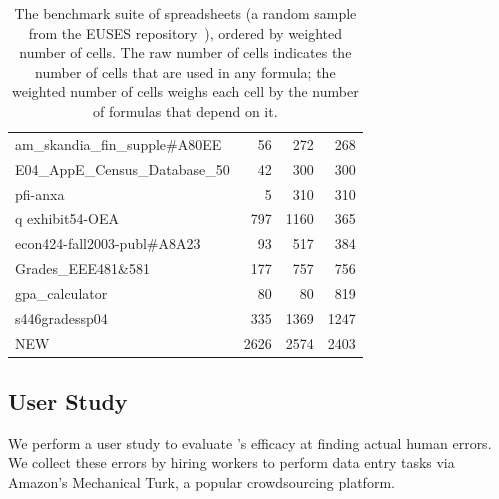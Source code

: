 \begin{table}[t!]
\begin{tabular}{l|rrr}
\small{am\_skandia\_fin\_supple\#A80EE} & \small{56} & \small{272} & \small{268} \\ 
\small{E04\_AppE\_Census\_Database\_50} & \small{42} & \small{300} & \small{300} \\ 
\small{pfi-anxa} & \small{5} & \small{310} & \small{310} \\ 
\small{q exhibit54-OEA} & \small{797} & \small{1160} & \small{365} \\ 
\small{econ424-fall2003-publ\#A8A23} & \small{93} & \small{517} & \small{384} \\ 
\small{Grades\_EEE481\&581} & \small{177} & \small{757} & \small{756} \\ 
\small{gpa\_calculator} & \small{80} & \small{80} & \small{819} \\ 
\small{s446gradessp04} & \small{335} & \small{1369} & \small{1247} \\ 
\small{NEW} & \small{2626} & \small{2574} & \small{2403} \\ 
    \hline
    \end{tabular}%
  \caption{The benchmark suite of spreadsheets (a random sample from the EUSES repository~\cite{Fisher:2005:ESC:1082983.1083242}), ordered by weighted number of cells. The raw number of cells indicates the number of cells that are used in any formula; the weighted number of cells weighs each cell by the number of formulas that depend on it.\label{tab:spreadsheet_characteristics}}
\end{table}





\subsection{User Study}
\label{sec:user_study}

We perform a user study to evaluate \checkcell{}'s efficacy at finding
actual human errors. We collect these errors by hiring workers to
perform data entry tasks via Amazon's Mechanical Turk, a popular
crowdsourcing platform.

